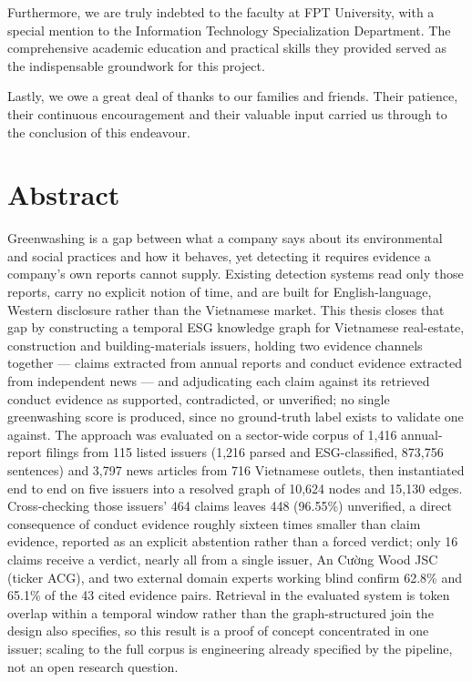 \documentclass[fontsize=12pt,oneside,headings=small]{scrreprt}
\begin{document}
Furthermore, we are truly indebted to the faculty at FPT University, with a special mention to the Information Technology Specialization Department. The comprehensive academic education and practical skills they provided served as the indispensable groundwork for this project.

Lastly, we owe a great deal of thanks to our families and friends. Their patience, their continuous encouragement and their valuable input carried us through to the conclusion of this endeavour.
\endgroup

\clearpage
\chapter*{Abstract}

Greenwashing is a gap between what a company says about its environmental and
social practices and how it behaves, yet detecting it requires evidence a
company's own reports cannot supply. Existing detection systems read only
those reports, carry no explicit notion of time, and are built for
English-language, Western disclosure rather than the Vietnamese market. This
thesis closes that gap by constructing a temporal ESG knowledge graph for
Vietnamese real-estate, construction and building-materials issuers, holding
two evidence channels together --- claims extracted from annual reports and
conduct evidence extracted from independent news --- and adjudicating each
claim against its retrieved conduct evidence as supported, contradicted, or
unverified; no single greenwashing score is produced, since no ground-truth
label exists to validate one against. The approach was evaluated on a
sector-wide corpus of 1,416 annual-report filings from 115 listed issuers
(1,216 parsed and ESG-classified, 873,756 sentences) and 3,797 news articles
from 716 Vietnamese outlets, then instantiated end to end on five issuers
into a resolved graph of 10,624 nodes and 15,130 edges. Cross-checking those
issuers' 464 claims leaves 448 (96.55\%) unverified, a direct consequence of
conduct evidence roughly sixteen times smaller than claim evidence, reported
as an explicit abstention rather than a forced verdict; only 16 claims
receive a verdict, nearly all from a single issuer, An Cường Wood JSC (ticker
ACG), and two external domain experts working blind confirm 62.8\% and
65.1\% of the 43 cited evidence pairs. Retrieval in the evaluated system is
token overlap within a temporal window rather than the graph-structured join
the design also specifies, so this result is a proof of concept concentrated
in one issuer; scaling to the full corpus is engineering already specified
by the pipeline, not an open research question.
\end{document}
